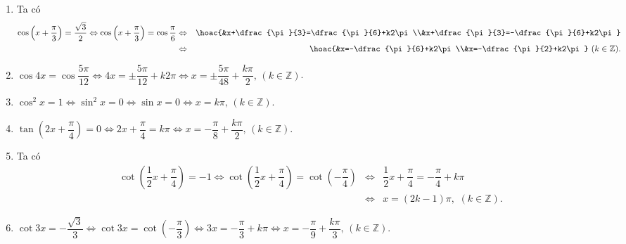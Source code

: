 \begin{bt}
{\begin{enumerate}
\begin{eqnarray*}
			\end{eqnarray*}
			\item Ta có
			\allowdisplaybreaks
			\begin{eqnarray*}
				\cos \left(x+\dfrac{\pi}{3}\right) = \dfrac{\sqrt{3}}{2} \Leftrightarrow \cos\left(x+\dfrac{\pi}{3}\right)=\cos\dfrac{\pi}{6} &\Leftrightarrow& \hoac{&x+\dfrac{\pi}{3}=\dfrac{\pi}{6}+k2\pi\\&x+\dfrac{\pi}{3}=-\dfrac{\pi}{6}+k2\pi}\\
				&\Leftrightarrow& \hoac{&x=-\dfrac{\pi}{6}+k2\pi\\&x=-\dfrac{\pi}{2}+k2\pi}\,\,(k\in\mathbb{Z}).
			\end{eqnarray*}
			\item $\cos 4 x=\cos \dfrac{5 \pi}{12}\Leftrightarrow4x=\pm\dfrac{5\pi}{12}+k2\pi\Leftrightarrow x=\pm\dfrac{5\pi}{48}+\dfrac{k\pi}{2},\,(k\in\mathbb{Z})$.
			\item $\cos^2x=1\Leftrightarrow\sin^2x=0\Leftrightarrow\sin x=0\Leftrightarrow x=k\pi,\,(k\in\mathbb{Z})$.
			\item $\tan \left(2 x+\dfrac{\pi}{4}\right)=0\Leftrightarrow2x+\dfrac{\pi}{4}=k\pi\Leftrightarrow x=-\dfrac{\pi}{8}+\dfrac{k\pi}{2},\,(k\in\mathbb{Z})$.
			\item Ta có
			\allowdisplaybreaks
			\begin{eqnarray*}
				\cot \left(\dfrac{1}{2} x+\dfrac{\pi}{4}\right)=-1 \Leftrightarrow \cot\left(\dfrac{1}{2}x+\dfrac{\pi}{4}\right)=\cot\left(-\dfrac{\pi}{4}\right) &\Leftrightarrow& \dfrac{1}{2}x+\dfrac{\pi}{4}=-\dfrac{\pi}{4}+k\pi\\
				&\Leftrightarrow& x=(2k-1)\pi,\,\,(k\in\mathbb{Z}).
			\end{eqnarray*}
			\item $\cot3x=-\dfrac{\sqrt{3}}{3}\Leftrightarrow\cot3x=\cot\left(-\dfrac{\pi}{3}\right)\Leftrightarrow3x=-\dfrac{\pi}{3}+k\pi\Leftrightarrow x=-\dfrac{\pi}{9}+\dfrac{k\pi}{3},\,(k\in\mathbb{Z})$.
		\end{enumerate}
	}
\end{bt}

